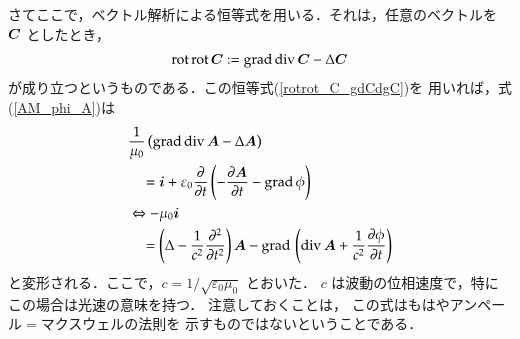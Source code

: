             さてここで，ベクトル解析による恒等式を用いる．それは，任意のベクトルを $\boldsymbol{C}$ としたとき，
            \begin{align}\label{rotrot_C_gdCdgC}
            \drot\drot\bC:=
           \dgrad\ddiv\bC - \Delta \bC
            \end{align}
            が成り立つというものである．この恒等式(\ref{rotrot_C_gdCdgC})を
            用いれば，式(\ref{AM_phi_A})は
            \begin{align}
            &\frac{1}{\mu_{0}}\left(\mathrm{grad}\,\mathrm{div}\,\boldsymbol{A} - \Delta \boldsymbol{A}\right) \notag \\
            &\quad=\boldsymbol{i}+ \varepsilon_{0}\frac{\partial }{\partial t} \left( -\frac{\partial\boldsymbol{A}}{\partial t}-\mathrm{grad}\,\phi\right) \notag \\
            &\Leftrightarrow -\mu_{0}\boldsymbol{i} \notag \\
            &\quad=\left(\Delta -\frac{1}{c^{2}}\frac{\partial^{2}}{\partial t^{2}}\right)\boldsymbol{A}
             -\mathrm{grad\,}\left( \mathrm{div}\,\boldsymbol{A} + \frac{1}{c^{2}}\frac{\partial \phi}{\partial t}\right)
            \end{align}
            と変形される．ここで，$c=1/\sqrt{\varepsilon_{0}\mu_{0}}$ とおいた．
            $c$ は波動の位相速度で，特にこの場合は光速の意味を持つ．
            注意しておくことは，
            この式はもはやアンペール$=$マクスウェルの法則を
            示すものではないということである．

